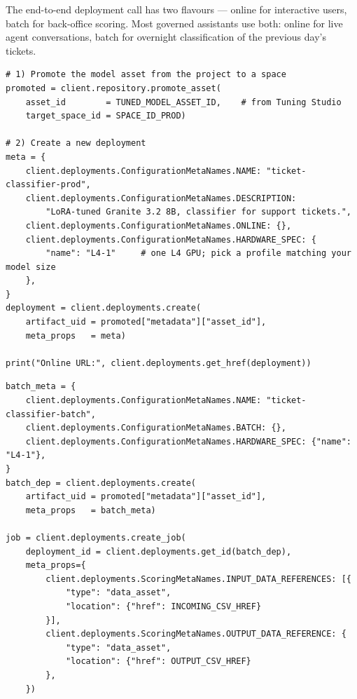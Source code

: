 The end-to-end deployment call has two flavours --- online for interactive users, batch for back-office scoring. Most governed assistants use both: online for live agent conversations, batch for overnight classification of the previous day's tickets.

\begin{examplebox}[title=\textbf{Promote a LoRA-tuned model and create an online deployment}]
\begin{lstlisting}[style=pythonstyle]
# 1) Promote the model asset from the project to a space
promoted = client.repository.promote_asset(
    asset_id        = TUNED_MODEL_ASSET_ID,    # from Tuning Studio
    target_space_id = SPACE_ID_PROD)

# 2) Create a new deployment
meta = {
    client.deployments.ConfigurationMetaNames.NAME: "ticket-classifier-prod",
    client.deployments.ConfigurationMetaNames.DESCRIPTION:
        "LoRA-tuned Granite 3.2 8B, classifier for support tickets.",
    client.deployments.ConfigurationMetaNames.ONLINE: {},
    client.deployments.ConfigurationMetaNames.HARDWARE_SPEC: {
        "name": "L4-1"     # one L4 GPU; pick a profile matching your model size
    },
}
deployment = client.deployments.create(
    artifact_uid = promoted["metadata"]["asset_id"],
    meta_props   = meta)

print("Online URL:", client.deployments.get_href(deployment))
\end{lstlisting}
\end{examplebox}

\begin{examplebox}[title=\textbf{Batch deployment for back-office scoring}]
\begin{lstlisting}[style=pythonstyle]
batch_meta = {
    client.deployments.ConfigurationMetaNames.NAME: "ticket-classifier-batch",
    client.deployments.ConfigurationMetaNames.BATCH: {},
    client.deployments.ConfigurationMetaNames.HARDWARE_SPEC: {"name": "L4-1"},
}
batch_dep = client.deployments.create(
    artifact_uid = promoted["metadata"]["asset_id"],
    meta_props   = batch_meta)

job = client.deployments.create_job(
    deployment_id = client.deployments.get_id(batch_dep),
    meta_props={
        client.deployments.ScoringMetaNames.INPUT_DATA_REFERENCES: [{
            "type": "data_asset",
            "location": {"href": INCOMING_CSV_HREF}
        }],
        client.deployments.ScoringMetaNames.OUTPUT_DATA_REFERENCE: {
            "type": "data_asset",
            "location": {"href": OUTPUT_CSV_HREF}
        },
    })
\end{lstlisting}
\end{examplebox}

